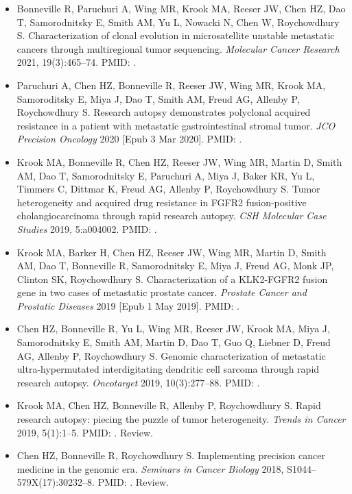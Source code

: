 \begin{vita}
\begin{publist}
\begin{itemize}
    \item Bonneville R, Paruchuri A, Wing MR, Krook MA, Reeser JW, Chen HZ, Dao T, Samorodnitsky E, Smith AM, Yu L, Nowacki N, Chen W, Roychowdhury S\@. Characterization of clonal evolution in microsatellite unstable metastatic cancers through multiregional tumor sequencing. \textit{Molecular Cancer Research} 2021, 19(3):465--74. PMID: .
    \item Paruchuri A\cofirst, Chen HZ\cofirst, Bonneville R, Reeser JW, Wing MR, Krook MA, Samoroditsky E, Miya J, Dao T, Smith AM, Freud AG, Allenby P, Roychowdhury S\@. Research autopsy demonstrates polyclonal acquired resistance in a patient with metastatic gastrointestinal stromal tumor. \textit{JCO Precision Oncology} 2020 [Epub 3 Mar 2020]. PMID: .
    \item Krook MA\cofirst, Bonneville R\cofirst, Chen HZ, Reeser JW, Wing MR, Martin D, Smith AM, Dao T, Samorodnitsky E, Paruchuri A, Miya J, Baker KR, Yu L, Timmers C, Dittmar K, Freud AG, Allenby P, Roychowdhury S\@. Tumor heterogeneity and acquired drug resistance in FGFR2 fusion-positive cholangiocarcinoma through rapid research autopsy. \textit{CSH Molecular Case Studies} 2019, 5:a004002. PMID: .
    \item Krook MA, Barker H, Chen HZ, Reeser JW, Wing MR, Martin D, Smith AM, Dao T, Bonneville R, Samorodnitsky E, Miya J, Freud AG, Monk JP, Clinton SK, Roychowdhury S\@. Characterization of a KLK2-FGFR2 fusion gene in two cases of metastatic prostate cancer. \textit{Prostate Cancer and Prostatic Diseases} 2019 [Epub 1 May 2019]. PMID: .
    \item Chen HZ\cofirst, Bonneville R\cofirst, Yu L, Wing MR, Reeser JW, Krook MA, Miya J, Samorodnitsky E, Smith AM, Martin D, Dao T, Guo Q, Liebner D, Freud AG, Allenby P, Roychowdhury S\@. Genomic characterization of metastatic ultra-hypermutated interdigitating dendritic cell sarcoma through rapid research autopsy. \textit{Oncotarget} 2019, 10(3):277--88. PMID: .
    \item Krook MA\cofirst, Chen HZ\cofirst, Bonneville R\cofirst, Allenby P, Roychowdhury S\@. Rapid research autopsy: piecing the puzzle of tumor heterogeneity. \textit{Trends in Cancer} 2019, 5(1):1--5. PMID: . Review.
    \item Chen HZ, Bonneville R, Roychowdhury S\@. Implementing precision cancer medicine in the genomic era. \textit{Seminars in Cancer Biology} 2018, S1044--579X(17):30232--8. PMID: . Review.

\end{itemize}
\end{publist}
\end{vita}
